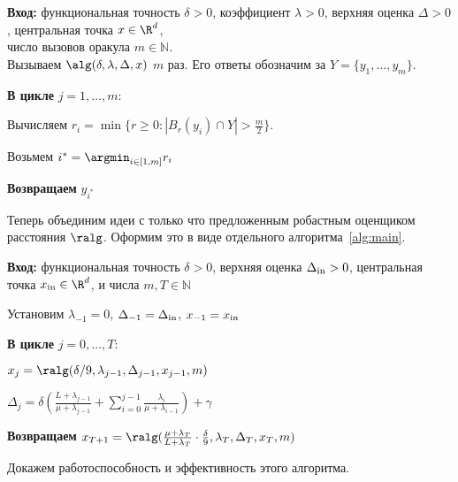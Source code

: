 \begin{algorithm}[H]
	{\bf Вход:} функциональная точность $\delta>0$, коэффициент $\lambda>0$, верхняя оценка $\Delta>0$,
	центральная точка $x\in\R^d$,\\
	\hspace{20pt} число вызовов оракула $m\in \mathbb{N}$.  \\
	Вызываем $\alg(\delta,\lambda,\Delta,x)$ $m$ раз. Его ответы обозначим за $Y=\{y_1,\ldots, y_m\}$.
	
	{\bf В цикле } $j=1,\ldots,m$:
    
	\hspace{20pt} Вычисляем $r_i=\min\{r\geq 0: |B_{r}(y_i)\cap Y|>\frac{m}{2}\}$.
	
	Возьмем $i^*=\argmin_{i\in [1,m]} r_i$ 
	
	{\bf Возвращаем} $y_{i^*}$		\\
	\caption{\ralg$(\delta,\lambda,\Delta,x,m)$	%
	}
	\label{alg:stoc_prox_high_prob2str}
\end{algorithm}


Теперь объединим идеи \pboost с только что предложенным робастным оценщиком расстояния $\ralg$. Оформим это в виде отдельного алгоритма~\ref{alg:main}.


\begin{algorithm}[H]
	{\bf Вход:}  функциональная точность $\delta>0$, верхняя оценка $\Delta_{\rm in}>0$,
	центральная точка $x_{\rm in}\in\R^d$, и числа $m,T\in\mathbb{N}$
	
	Установим $\lambda_{-1}=0$, $\Delta_{-1}=\Delta_{\rm in}$, $x_{-1}= x_{\rm in}$
	
	{\bf В цикле } $j=0,\ldots, T$:
    
	\hspace{20pt}  $x_{j}=\ralg(\delta/9,\lambda_{j-1},\Delta_{j-1},x_{j-1},m)$
	
	\hspace{20pt} $\Delta_j=\delta\left(\frac{L+\lambda_{j-1}}{\mu+\lambda_{j-1}}+\sum_{i=0}^{j-1}\frac{ \lambda_i}{\mu+\lambda_{i-1}}\right) + \gamma$
	
	
	{\bf Возвращаем} $x_{T+1}=\ralg(\frac{\mu+\lambda_T}{L+\lambda_T}\cdot\frac{\delta}{9},\lambda_{T},\Delta_{T},x_{T},m)$
						
	
    \caption{$\balg(\delta,\Delta_{\rm in}, x_{\rm in},T,m)$
	}
	\label{alg:main}
\end{algorithm}


Докажем работоспособность и эффективность этого алгоритма.

